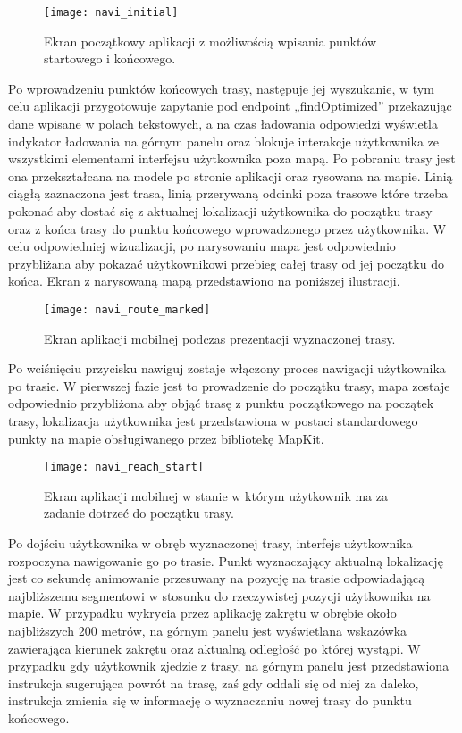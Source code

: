 \begin{figure}[H]
\centering
\texttt{[image: navi\_initial]}
\caption{Ekran początkowy aplikacji z możliwością wpisania punktów startowego i końcowego.}
\end{figure}

Po wprowadzeniu punktów końcowych trasy, następuje jej wyszukanie, w tym celu aplikacji przygotowuje zapytanie pod endpoint „findOptimized” przekazując dane wpisane w polach tekstowych, a na czas ładowania odpowiedzi wyświetla indykator ładowania na górnym panelu oraz blokuje interakcje użytkownika ze wszystkimi elementami interfejsu użytkownika poza mapą. Po pobraniu trasy jest ona przekształcana na modele po stronie aplikacji oraz rysowana na mapie. Linią ciągłą zaznaczona jest trasa, linią przerywaną odcinki poza trasowe które trzeba pokonać aby dostać się z aktualnej lokalizacji użytkownika do początku trasy oraz z końca trasy do punktu końcowego wprowadzonego przez użytkownika. W celu odpowiedniej wizualizacji, po narysowaniu mapa jest odpowiednio przybliżana aby pokazać użytkownikowi przebieg całej trasy od jej początku do końca. Ekran z narysowaną mapą przedstawiono na poniższej ilustracji.

\begin{figure}[H]
	\begin{center}
		\texttt{[image: navi\_route\_marked]}
	\end{center}
	\caption{Ekran aplikacji mobilnej podczas prezentacji wyznaczonej trasy.}
\end{figure}

Po wciśnięciu przycisku nawiguj zostaje włączony proces nawigacji użytkownika po trasie. W pierwszej fazie jest to prowadzenie do początku trasy, mapa zostaje odpowiednio przybliżona aby objąć trasę z punktu początkowego na początek trasy, lokalizacja użytkownika jest przedstawiona w postaci standardowego punkty na mapie obsługiwanego przez bibliotekę MapKit.

\begin{figure}[H]
\centering
\texttt{[image: navi\_reach\_start]}
\caption{Ekran aplikacji mobilnej w stanie w którym użytkownik ma za zadanie dotrzeć do początku trasy.}
\end{figure}

Po dojściu użytkownika w obręb wyznaczonej trasy, interfejs użytkownika rozpoczyna nawigowanie go po trasie. Punkt wyznaczający aktualną lokalizację jest co sekundę animowanie przesuwany na pozycję na trasie odpowiadającą najbliższemu segmentowi w stosunku do rzeczywistej pozycji użytkownika na mapie. W przypadku wykrycia przez aplikację zakrętu w obrębie około najbliższych 200 metrów, na górnym panelu jest wyświetlana wskazówka zawierająca kierunek zakrętu oraz aktualną odległość po której wystąpi. W przypadku gdy użytkownik zjedzie z trasy, na górnym panelu jest przedstawiona instrukcja sugerująca powrót na trasę, zaś gdy oddali się od niej za daleko, instrukcja zmienia się w informację o wyznaczaniu nowej trasy do punktu końcowego.

